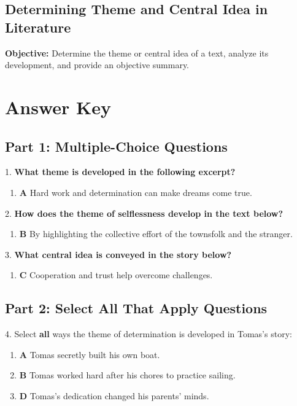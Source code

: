 \documentclass[12pt]{article}
\begin{document}
\subsection*{Determining Theme and Central Idea in Literature}
\onehalfspacing

\begin{tcolorbox}[colframe=black!40, colback=gray!0, title=Learning Objective]
\textbf{Objective:} Determine the theme or central idea of a text, analyze its development, and provide an objective summary.
\end{tcolorbox}

\section*{Answer Key}

\subsection*{Part 1: Multiple-Choice Questions}

1. \textbf{What theme is developed in the following excerpt?}
\begin{enumerate}[label=\Alph*.]
    \item \textbf{A} Hard work and determination can make dreams come true.
\end{enumerate}

2. \textbf{How does the theme of selflessness develop in the text below?}
\begin{enumerate}[label=\Alph*.]
    \item \textbf{B} By highlighting the collective effort of the townsfolk and the stranger.
\end{enumerate}

3. \textbf{What central idea is conveyed in the story below?}
\begin{enumerate}[label=\Alph*.]
    \item \textbf{C} Cooperation and trust help overcome challenges.
\end{enumerate}

\subsection*{Part 2: Select All That Apply Questions}

4. Select \textbf{all} ways the theme of determination is developed in Tomas’s story:  
\begin{enumerate}[label=\Alph*.]
    \item \textbf{A} Tomas secretly built his own boat.  
    \item \textbf{B} Tomas worked hard after his chores to practice sailing.  
    \item \textbf{D} Tomas’s dedication changed his parents’ minds.  
\end{enumerate}
\end{document}
